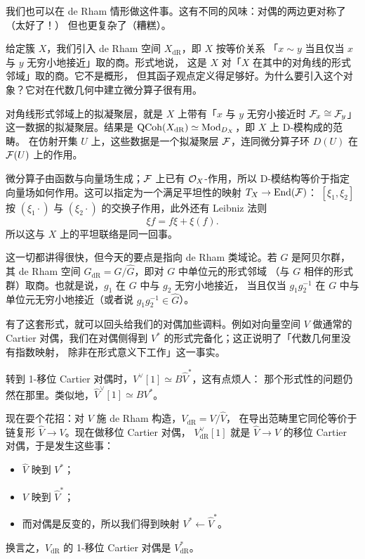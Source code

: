 \begin{example}
我们也可以在 de Rham 情形做这件事。这有不同的风味：对偶的两边更对称了（太好了！）
但也更复杂了（糟糕）。

给定簇 $X$，我们引入 de Rham 空间 $X_{\mathrm{dR}}$，即 $X$ 按等价关系
「$x\sim y$ 当且仅当 $x$ 与 $y$ 无穷小地接近」取的商。形式地说，
这是 $X$ 对「$X$ 在其中的对角线的形式邻域」取的商。它不是概形，
但其函子观点定义得足够好。为什么要引入这个对象？它对在代数几何中建立微分算子很有用。

对角线形式邻域上的拟凝聚层，就是 $X$ 上带有「$x$ 与 $y$ 无穷小接近时
$\mathcal{F}_x\cong\mathcal{F}_y$」这一数据的拟凝聚层。结果是
$\mathrm{QCoh}(X_{\mathrm{dR}})\simeq\mathrm{Mod}_{D_X}$，即 $X$ 上 D-模构成的范畴。
在仿射开集 $U$ 上，这些数据是一个拟凝聚层 $\mathcal{F}$，连同微分算子环 $D(U)$ 在 $\mathcal{F}(U)$
上的作用。

微分算子由函数与向量场生成；$\mathcal{F}$ 上已有 $\mathcal{O}_X$-作用，所以 D-模结构等价于指定
向量场如何作用。这可以指定为一个满足平坦性的映射 $T_X\to\operatorname{End}(\mathcal{F})$：
$[\xi_1,\xi_2]$ 按 $(\xi_1\cdot)$ 与 $(\xi_2\cdot)$ 的交换子作用，此外还有 Leibniz 法则
\[
\xi f=f\xi+\xi(f).
\]
所以这与 $X$ 上的平坦联络是同一回事。

这一切都讲得很快，但今天的要点是指向 de Rham 类域论。若 $G$ 是阿贝尔群，
其 de Rham 空间 $G_{\mathrm{dR}}=G/\hat G$，即对 $G$ 中单位元的形式邻域
（与 $G$ 相伴的形式群）取商。也就是说，$g_1$ 在 $G$ 中与 $g_2$ 无穷小地接近，
当且仅当 $g_1g_2^{-1}$ 在 $G$ 中与单位元无穷小地接近（或者说 $g_1g_2^{-1}\in\hat G$）。

有了这套形式，就可以回头给我们的对偶加些调料。例如对向量空间 $V$ 做通常的
Cartier 对偶，我们在对偶侧得到 $V^*$ 的形式完备化；这正说明了「代数几何里没有指数映射，
除非在形式意义下工作」这一事实。

转到 1-移位 Cartier 对偶时，$V^\vee[1]\simeq B\hat V^*$，这有点烦人：
那个形式性的问题仍然在那里。类似地，$\hat V^\vee[1]\simeq BV^*$。

现在耍个花招：对 $V$ 施 de Rham 构造，$V_{\mathrm{dR}}=V/\hat V$，
在导出范畴里它同伦等价于链复形 $\hat V\to V$。现在做移位 Cartier 对偶，
$V^\vee_{\mathrm{dR}}[1]$ 就是 $\hat V\to V$ 的移位 Cartier 对偶，于是发生这些事：
\begin{itemize}
\item $\hat V$ 映到 $V^*$；
\item $V$ 映到 $\hat V^*$；
\item 而对偶是反变的，所以我们得到映射 $V^*\leftarrow\hat V^*$。
\end{itemize}
换言之，$V_{\mathrm{dR}}$ 的 1-移位 Cartier 对偶是 $V^*_{\mathrm{dR}}$。


\end{example}
